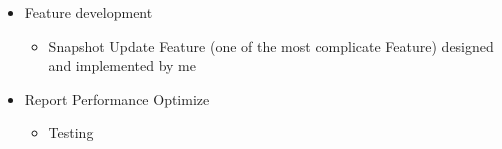 \documentclass{resume}
\begin{document}
\begin{itemize}
\begin{itemize}
          \item Feature development
                \begin{itemize}
                  \item Snapshot Update Feature (one of the most complicate Feature) designed and implemented by me
                \end{itemize}
          \item  Report Performance Optimize
                \begin{itemize}
                  \item Testing
                \end{itemize}
        \end{itemize}
\end{itemize}
\end{document}
